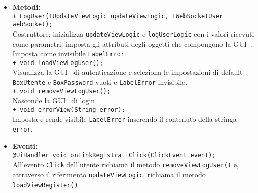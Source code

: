 {\begin{sloppypar}
{\begin{itemize}
\begin{itemize}
				\texttt{@UiField InlineLabel LabelError;}\\
				Label che in presenza di errore segnala il tipo di errore.\\
				
				\texttt{@UiField PushButton LogUserSubmit;}\\
				Bottone per l'invio della richiesta controllo delle credenziali di autenticazione.\\
				
				\texttt{@UiField InlineHyperlink LinkRegistrati;}\\
				Link per passare alla grafica della registrazione.\\
				
			\item[] \textbf{Metodi:}\\
				\texttt{+ LogUser(IUpdateViewLogic updateViewLogic, IWebSocketUser webSocket);}\\
				Costruttore: inizializza \texttt{updateViewLogic} e \texttt{logUserLogic} con i valori ricevuti come parametri, imposta gli attributi degli oggetti che compongono la GUI\g~. Imposta come invisibile \texttt{LabelError}.\\
				
				\texttt{+ void loadViewLogUser();}\\
				Visualizza la GUI\g~ di autenticazione e seleziona le impostazioni di default\g~: \texttt{BoxUtente} e \texttt{BoxPassword} vuoti e \texttt{LabelError} invisibile.\\
				
				\texttt{+ void removeViewLogUser();}\\
				Nasconde la GUI\g~ di login.\\
				
				\texttt{+ void errorView(String error);}\\
				Imposta e rende visibile \texttt{LabelError} inserendo il contenuto della stringa \texttt{error}.\\
				
			\item[] \textbf{Eventi:}\\
				\texttt{@UiHandler void onLinkRegistratiClick(ClickEvent event);}\\
				All’evento \texttt{Click} dell’utente richiama il metodo \texttt{removeViewLogUser()} e, attraverso il riferimento \texttt{updateViewLogic}, richiama il metodo \texttt{loadViewRegister()}.\\
				

\end{itemize}
\end{itemize}}
\end{sloppypar}}
